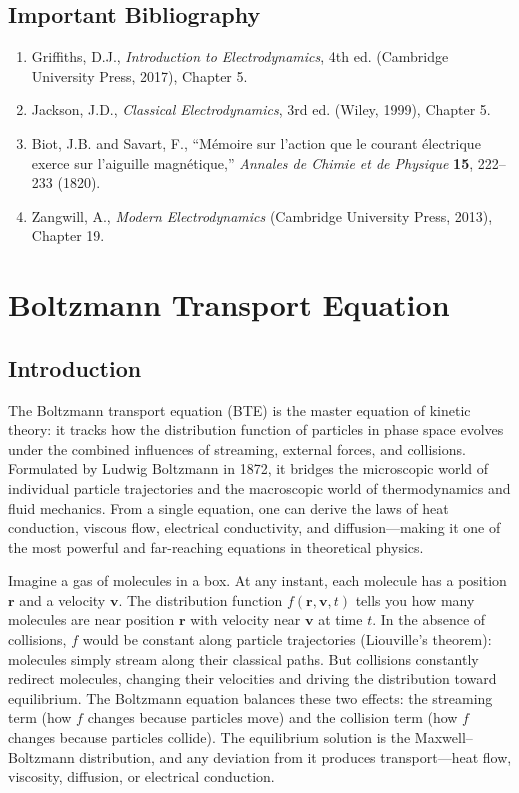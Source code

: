 \documentclass[11pt,openright]{book}
\begin{document}
\section*{Important Bibliography}
\begin{enumerate}
\item Griffiths, D.J., \textit{Introduction to Electrodynamics}, 4th ed. (Cambridge University Press, 2017), Chapter 5.
\item Jackson, J.D., \textit{Classical Electrodynamics}, 3rd ed. (Wiley, 1999), Chapter 5.
\item Biot, J.B. and Savart, F., ``Mémoire sur l'action que le courant électrique exerce sur l'aiguille magnétique,'' \textit{Annales de Chimie et de Physique} \textbf{15}, 222--233 (1820).
\item Zangwill, A., \textit{Modern Electrodynamics} (Cambridge University Press, 2013), Chapter 19.
\end{enumerate}


\chapter{Boltzmann Transport Equation}

\section*{Introduction}

The Boltzmann transport equation (BTE) is the master equation of kinetic theory: it tracks how the distribution function of particles in phase space evolves under the combined influences of streaming, external forces, and collisions. Formulated by Ludwig Boltzmann in 1872, it bridges the microscopic world of individual particle trajectories and the macroscopic world of thermodynamics and fluid mechanics. From a single equation, one can derive the laws of heat conduction, viscous flow, electrical conductivity, and diffusion---making it one of the most powerful and far-reaching equations in theoretical physics.

Imagine a gas of molecules in a box. At any instant, each molecule has a position $\mathbf{r}$ and a velocity $\mathbf{v}$. The distribution function $f(\mathbf{r}, \mathbf{v}, t)$ tells you how many molecules are near position $\mathbf{r}$ with velocity near $\mathbf{v}$ at time $t$. In the absence of collisions, $f$ would be constant along particle trajectories (Liouville's theorem): molecules simply stream along their classical paths. But collisions constantly redirect molecules, changing their velocities and driving the distribution toward equilibrium. The Boltzmann equation balances these two effects: the streaming term (how $f$ changes because particles move) and the collision term (how $f$ changes because particles collide). The equilibrium solution is the Maxwell--Boltzmann distribution, and any deviation from it produces transport---heat flow, viscosity, diffusion, or electrical conduction.
\end{document}

